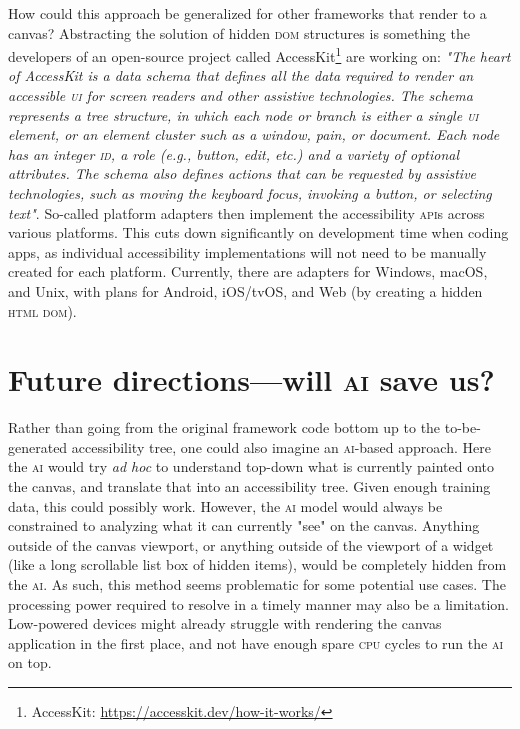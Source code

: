 \documentclass[sigconf]{acmart}
\begin{document}
How could this approach be generalized for other frameworks that render to a canvas? Abstracting the solution of hidden \textsc{dom} structures is something the developers of an open-source project called AccessKit\footnote{AccessKit: \url{https://accesskit.dev/how-it-works/}} are working on: \textit{"The heart of AccessKit is a data schema that defines all the data required to render an accessible \textsc{ui} for screen readers and other assistive technologies. The schema represents a tree structure, in which each node or branch is either a single \textsc{ui} element, or an element cluster such as a window, pain, or document. Each node has an integer \textsc{id}, a role (\textit{e.g.}, button, edit, etc.) and a variety of optional attributes. The schema also defines actions that can be requested by assistive technologies, such as moving the keyboard focus, invoking a button, or selecting text"}. So-called platform adapters then implement the accessibility \textsc{api}s across various platforms. This cuts down significantly on development time when coding apps, as individual accessibility implementations will not need to be manually created for each platform. Currently, there are adapters for Windows, mac\textsc{OS}, and Unix, with plans for Android, i\textsc{OS}/tv\textsc{OS}, and Web (by creating a hidden \textsc{html dom}).

\section{Future directions---will \textsc{ai} save us?}

Rather than going from the original framework code bottom up to the to-be-generated accessibility tree, one could also imagine an \textsc{ai}-based approach. Here the \textsc{ai} would try \textit{ad hoc} to understand top-down what is currently painted onto the canvas, and translate that into an accessibility tree. Given enough training data, this could possibly work. However, the \textsc{ai} model would always be constrained to analyzing what it can currently "see" on the canvas. Anything outside of the canvas viewport, or anything outside of the viewport of a widget (like a long scrollable list box of hidden items), would be completely hidden from the \textsc{ai}. As such, this method seems problematic for some potential use cases. The processing power required to resolve in a timely manner may also be a limitation. Low-powered devices might already struggle with rendering the canvas application in the first place, and not have enough spare \textsc{cpu} cycles to run the \textsc{ai} on top. 
\end{document}
